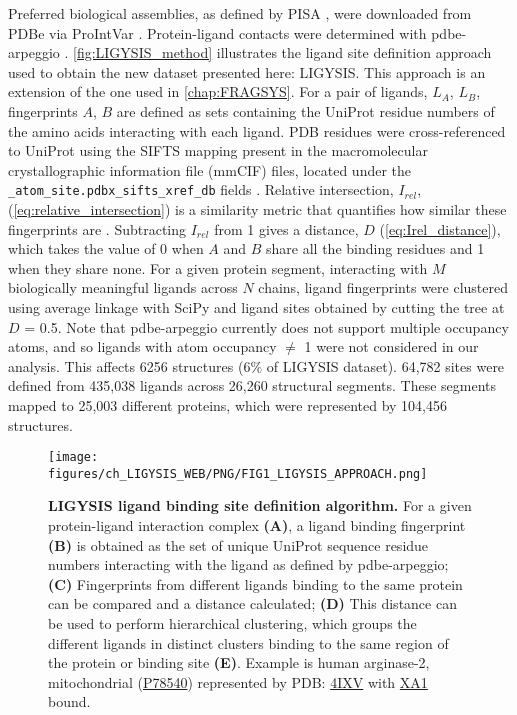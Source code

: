 Preferred biological assemblies, as defined by PISA \cite{KRISSINEL_2007_PISA}, were downloaded from PDBe via ProIntVar \cite{MACGOWAN_2020_DRSASP}. Protein-ligand contacts were determined with pdbe-arpeggio \cite{JUBB_2017_ARPEGGIO}. \autoref{fig:LIGYSIS_method} illustrates the ligand site definition approach used to obtain the new dataset presented here: LIGYSIS. This approach is an extension of the one used in \autoref{chap:FRAGSYS}. For a pair of ligands, $L_A$, $L_B$, fingerprints $A$, $B$ are defined as sets containing the UniProt residue numbers of the amino acids interacting with each ligand. PDB residues were cross-referenced to UniProt using the SIFTS mapping present in the macromolecular crystallographic information file (mmCIF) files, located under the \texttt{\_atom\_site.pdbx\_si\discretionary{-}{}{}fts\_xref\_db} fields \cite{VELANKAR_2012_SIFTS, DANA_2018_SIFTS}. Relative intersection, $I_{rel}$, (\autoref{eq:relative_intersection}) is a similarity metric that quantifies how similar these fingerprints are \cite{UTGES_2024_FRAGSYS}. Subtracting $I_{rel}$ from 1 gives a distance, $D$ (\autoref{eq:Irel_distance}), which takes the value of 0 when $A$ and $B$ share all the binding residues and 1 when they share none. For a given protein segment, interacting with $M$ biologically meaningful ligands across $N$ chains, ligand fingerprints were clustered using average linkage with SciPy \cite{VIRTANEN_2020_SCIPY} and ligand sites obtained by cutting the tree at $D$ = 0.5. Note that pdbe-arpeggio currently does not support multiple occupancy atoms, and so ligands with atom occupancy $\neq$ 1 were not considered in our analysis. This affects 6256 structures (6\% of LIGYSIS dataset). 64,782 sites were defined from 435,038 ligands across 26,260 structural segments. These segments mapped to 25,003 different proteins, which were represented by 104,456 structures.

\begin{figure}[htb!]
    \centering
    \texttt{[image: figures/ch\_LIGYSIS\_WEB/PNG/FIG1\_LIGYSIS\_APPROACH.png]}
    \caption[LIGYSIS ligand binding site definition algorithm]{\textbf{LIGYSIS ligand binding site definition algorithm.} For a given protein-ligand interaction complex \textbf{(A)}, a ligand binding fingerprint \textbf{(B)} is obtained as the set of unique UniProt sequence residue numbers interacting with the ligand as defined by pdbe-arpeggio; \textbf{(C)} Fingerprints from different ligands binding to the same protein can be compared and a distance calculated; \textbf{(D)} This distance can be used to perform hierarchical clustering, which groups the different ligands in distinct clusters binding to the same region of the protein or binding site \textbf{(E)}. Example is human arginase-2, mitochondrial (\href{https://www.uniprot.org/uniprotkb/P78540/entry}{P78540}) represented by PDB: \href{https://www.ebi.ac.uk/pdbe/entry/pdb/4ixv}{4IXV} \cite{GOLEBIOWSKI_2013_ARGINASE} with \href{https://www.ebi.ac.uk/pdbe-srv/pdbechem/chemicalCompound/show/XA1}{XA1} bound.}
    \label{fig:LIGYSIS_method}
\end{figure}

